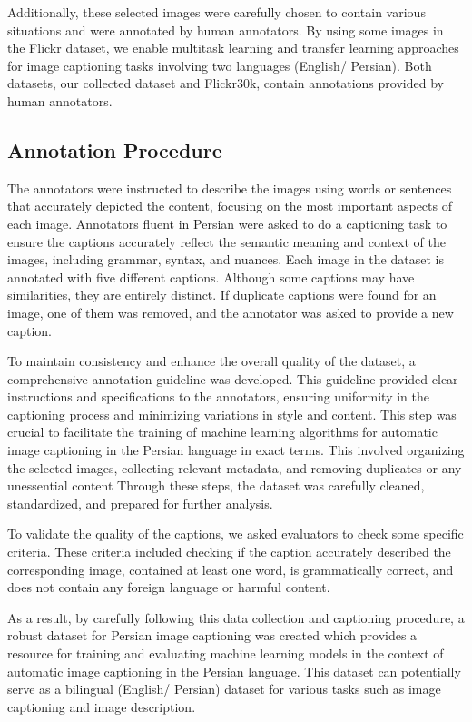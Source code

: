 \documentclass[runningheads]{llncs}
\begin{document}
Additionally, these selected images were carefully chosen to contain various situations and were annotated by human annotators. By using some images in the Flickr dataset, we enable multitask learning and transfer learning approaches for image captioning tasks involving two languages (English/ Persian). Both datasets, our collected dataset and Flickr30k, contain annotations provided by human annotators.

\subsection{Annotation Procedure}
The annotators were instructed to describe the images using words or sentences that accurately depicted the content, focusing on the most important aspects of each image. Annotators fluent in Persian were asked to do a captioning task to ensure the captions accurately reflect the semantic meaning and context of the images, including grammar, syntax, and nuances. Each image in the dataset is annotated with five different captions. Although some captions may have similarities, they are entirely distinct. If duplicate captions were found for an image, one of them was removed, and the annotator was asked to provide a new caption.

To maintain consistency and enhance the overall quality of the dataset, a comprehensive annotation guideline was developed. This guideline provided clear instructions and specifications to the annotators, ensuring uniformity in the captioning process and minimizing variations in style and content. This step was crucial to facilitate the training of machine learning algorithms for automatic image captioning in the Persian language in exact terms. This involved organizing the selected images, collecting relevant metadata, and removing duplicates or any unessential content Through these steps, the dataset was carefully cleaned, standardized, and prepared for further analysis. 

To validate the quality of the captions, we asked evaluators to check some specific criteria. These criteria included checking if the caption accurately described the corresponding image, contained at least one word, is grammatically correct, and does not contain any foreign language or harmful content. 

As a result, by carefully following this data collection and captioning procedure, a robust dataset for Persian image captioning was created which provides a resource for training and evaluating machine learning models in the context of automatic image captioning in the Persian language. This dataset can potentially serve as a bilingual (English/ Persian) dataset for various tasks such as image captioning and image description. 
\end{document}
